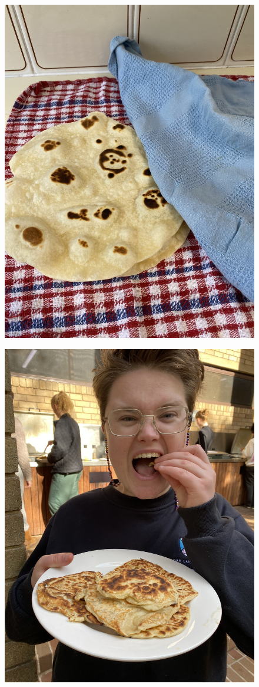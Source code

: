 \documentclass[]{article}
\begin{document}
\newpage\begin{figure}[H]
\begin{center}\hyperref[rec:Flatbread (Milk)]{\includegraphics[keepaspectratio,width=\textheight,height=\textwidth,angle=-90]{Gallery/Flatbread (Milk)}}\caption*{}\label{fig:Flatbread (Milk)}\end{center}
\end{figure}
\newpage\begin{figure}[H]
\begin{center}\hyperref[rec:Flatbread (Yoghurt)]{\includegraphics[keepaspectratio,width=\textheight,height=\textwidth,angle=-90]{Gallery/Flatbread (Yoghurt)}}\caption*{}\label{fig:Flatbread (Yoghurt)}\end{center}
\end{figure}
\end{document}
